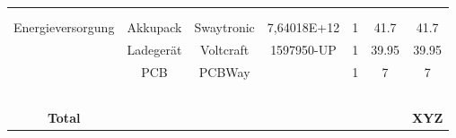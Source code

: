\documentclass[main.tex]{subfiles} %
\begin{document}
\begin{landscape}
\begin{table}[h]
{\begin{tabular}{|c|c|c|c|c|c|c|}
                            &                            &                        &                                    &                     &                            &                                 \\ \hline
                            &                            &                        &                                    &                     &                            &                                 \\ \hline
                            &                            &                        &                                    &                     &                            &                                 \\ \hline
        Energieversorgung   & Akkupack                   & Swaytronic             & 7,64018E+12                        & 1                   & 41.7                       & 41.7                            \\ \hline
                            & Ladegerät                  & Voltcraft              & 1597950-UP                         & 1                   & 39.95                      & 39.95                           \\ \hline
                            & PCB                        & PCBWay                 &                                    & 1                   & 7                          & 7                               \\ \hline
                            &                            &                        &                                    &                     &                            &                                 \\ \hline
                            &                            &                        &                                    &                     &                            &                                 \\ \hline
                            &                            &                        &                                    &                     &                            &                                 \\ \hline
                            &                            &                        &                                    &                     &                            &                                 \\ \hline
                            &                            &                        &                                    &                     &                            &                                 \\ \hline
     \textbf{Total}         &                            &                        &                                    &                     &                            & \textbf{XYZ}                                \\ \hline
    

\end{tabular}}
\end{table}
\end{landscape}
\end{document}

